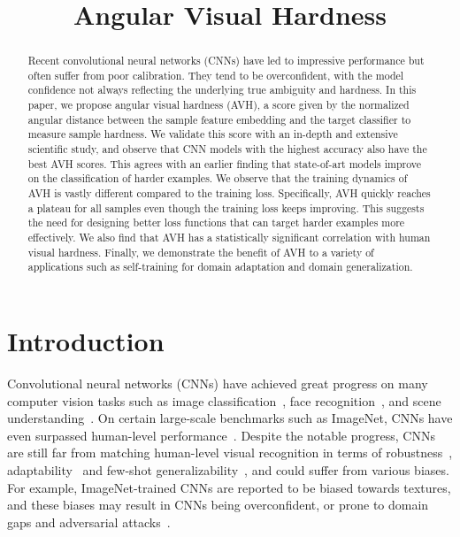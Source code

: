 \title{Angular Visual Hardness}

\begin{abstract}
Recent convolutional neural networks (CNNs) have led to impressive performance but often suffer from poor calibration. They tend to be overconfident, with the model confidence not always reflecting the underlying true ambiguity and hardness. In this paper, we propose angular visual hardness (AVH), a score given by the normalized angular distance between the sample feature embedding and the target classifier to measure sample hardness. We validate this score with an in-depth and extensive scientific study, and observe that CNN models with the highest accuracy also have the best AVH scores. This agrees with an earlier finding that state-of-art models improve on the classification of harder examples. We observe that the training dynamics of AVH is vastly different compared to the training loss. Specifically, AVH quickly reaches a plateau for all samples even though the training loss keeps improving. This suggests the need for designing better loss functions that can target harder examples more effectively. We also find that AVH has a statistically significant correlation with human visual hardness. Finally, we demonstrate the benefit of AVH to a variety of applications such as self-training for domain adaptation and domain generalization.
\end{abstract}

\section{Introduction}
Convolutional neural networks (CNNs) have achieved great progress on many computer vision tasks such as image classification~\cite{he2016deep,krizhevsky2012imagenet}, face recognition~\cite{sun2014deep,sphereface,liu2018learning}, and scene understanding~\cite{zhou2014learning,long2015fully}. On certain large-scale benchmarks such as ImageNet, CNNs have even surpassed human-level performance~\cite{deng2009imagenet}. Despite the notable progress, CNNs are still far from matching human-level visual recognition in terms of robustness~\cite{goodfellow2014explaining,wang2018iterative}, adaptability~\cite{finn2017model} and few-shot generalizability~\citep{hariharan2017low,liu2019neural}, and could suffer from various biases. For example, ImageNet-trained CNNs are reported to be biased towards textures, and these biases may result in CNNs being overconfident, or prone to domain gaps and adversarial attacks~\citep{geirhos2019imagenet}. 

